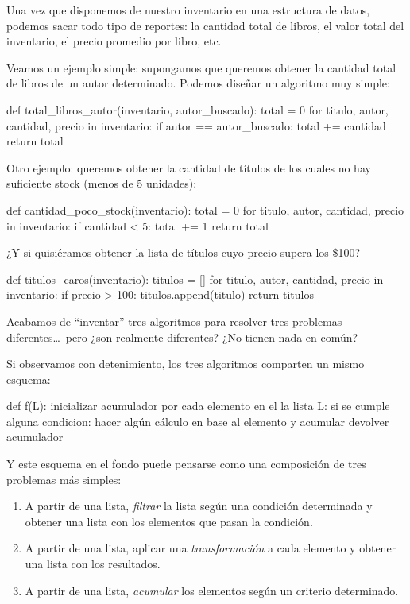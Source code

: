 \begin{subappendices}
Una vez que disponemos de nuestro inventario en una estructura de datos,
podemos sacar todo tipo de
reportes: la cantidad total de libros, el valor total del
inventario, el precio promedio por libro, etc.

Veamos un ejemplo simple: supongamos que queremos obtener la cantidad total de
libros de un autor determinado. Podemos diseñar un algoritmo muy simple:

\begin{codigo-python-sn}
def total_libros_autor(inventario, autor_buscado):
    total = 0
    for titulo, autor, cantidad, precio in inventario:
        if autor == autor_buscado:
            total += cantidad
    return total
\end{codigo-python-sn}

Otro ejemplo: queremos obtener la cantidad de títulos de los cuales no hay
suficiente stock (menos de 5 unidades):

\begin{codigo-python-sn}
def cantidad_poco_stock(inventario):
    total = 0
    for titulo, autor, cantidad, precio in inventario:
        if cantidad < 5:
            total += 1
    return total
\end{codigo-python-sn}

¿Y si quisiéramos obtener la lista de títulos cuyo precio supera los \$100?

\begin{codigo-python-sn}
def titulos_caros(inventario):
    titulos = []
    for titulo, autor, cantidad, precio in inventario:
        if precio > 100:
            titulos.append(titulo)
    return titulos
\end{codigo-python-sn}

Acabamos de ``inventar'' tres algoritmos para resolver tres problemas
diferentes\ldots\ pero ¿son realmente diferentes? ¿No tienen nada en común?

Si observamos con detenimiento, los tres algoritmos comparten un mismo esquema:

\begin{codigo-nohl-sn}
def f(L):
    inicializar acumulador
    por cada elemento en el la lista L:
        si se cumple alguna condicion:
            hacer algún cálculo en base al elemento y acumular
    devolver acumulador
\end{codigo-nohl-sn}

Y este esquema en el fondo puede pensarse como una composición de tres
problemas más simples:

\begin{enumerate}
    \item A partir de una lista, \emph{filtrar} la lista según una condición
        determinada y obtener una lista con los elementos que pasan la
        condición.
    \item A partir de una lista, aplicar una \emph{transformación} a cada elemento
        y obtener una lista con los resultados.
    \item A partir de una lista, \emph{acumular} los elementos según un
        criterio determinado.
\end{enumerate}


\end{subappendices}
